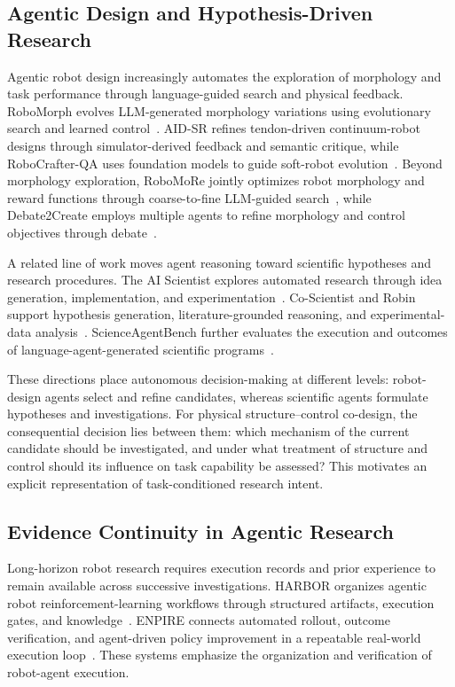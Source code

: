 \subsection{Agentic Design and Hypothesis-Driven Research}

Agentic robot design increasingly automates the exploration of morphology and task performance through language-guided search and physical feedback. RoboMorph evolves LLM-generated morphology variations using evolutionary search and learned control~\cite{qiu2026robomorph}. AID-SR refines tendon-driven continuum-robot designs through simulator-derived feedback and semantic critique, while RoboCrafter-QA uses foundation models to guide soft-robot evolution~\cite{chen2026aidsr,chen2026robocrafter}. Beyond morphology exploration, RoboMoRe jointly optimizes robot morphology and reward functions through coarse-to-fine LLM-guided search~\cite{fang2025robomore}, while Debate2Create employs multiple agents to refine morphology and control objectives through debate~\cite{qiu2026debate2create}.

A related line of work moves agent reasoning toward scientific hypotheses and research procedures. The AI Scientist explores automated research through idea generation, implementation, and experimentation~\cite{lu2024aiscientist}. Co-Scientist and Robin support hypothesis generation, literature-grounded reasoning, and experimental-data analysis~\cite{gottweis2026coscientist,ghareeb2026robin}. ScienceAgentBench further evaluates the execution and outcomes of language-agent-generated scientific programs~\cite{chen2025scienceagentbench}.

These directions place autonomous decision-making at different levels: robot-design agents select and refine candidates, whereas scientific agents formulate hypotheses and investigations. For physical structure--control co-design, the consequential decision lies between them: which mechanism of the current candidate should be investigated, and under what treatment of structure and control should its influence on task capability be assessed? This motivates an explicit representation of task-conditioned research intent.

\subsection{Evidence Continuity in Agentic Research}

Long-horizon robot research requires execution records and prior experience to remain available across successive investigations. HARBOR organizes agentic robot reinforcement-learning workflows through structured artifacts, execution gates, and knowledge~\cite{li2026harbor}. ENPIRE connects automated rollout, outcome verification, and agent-driven policy improvement in a repeatable real-world execution loop~\cite{xiao2026enpire}. These systems emphasize the organization and verification of robot-agent execution.


